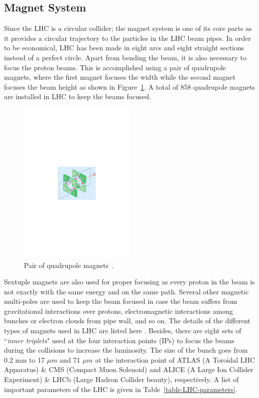 \subsection{Magnet System}
Since the LHC is a circular collider; the magnet system is one of its core parts as it provides a circular trajectory to the particles in the LHC beam pipes.
In order to be economical, LHC has been made in eight arcs and eight straight sections instead of a perfect circle. Apart from bending the beam, it is also necessary to focus the proton beams. 
This is accomplished using a pair of quadrupole magnets, where the first magnet focuses the width while the second magnet focuses the beam height as shown in Figure~\ref{fig:QuadrupoleMagnet}.
A total of 858 quadrupole magnets are installed in LHC to keep the beams focused. 
\begin{figure}[!htbp]
	\centering
	\includegraphics[width=0.50\textwidth]{figures/LHC/quadrupole_magnet_pair.pdf}
	\caption{Pair of quadrupole magnets~\cite{Vidal}.}
	\label{fig:QuadrupoleMagnet}
\end{figure}

Sextuple magnets are also used for proper focusing as every proton in the beam is not exactly with the same energy and on the same path. 
Several other magnetic multi-poles are used to keep the beam focused  in case the beam suffers from gravitational interactions over protons, electromagnetic interactions among bunches or electron clouds from pipe wall, and so on.
The details of the different types of magnets used in LHC are listed here \cite{WebLink:LHC_magnets}.
Besides, there are eight sets of ``\textit{inner triplets}" used at the four interaction points (IPs) to focus the beams during the collisions to increase the luminosity. The size of the bunch goes from 0.2 mm to 17 $\mu m$ and 71 $\mu m$ at the interaction point of ATLAS (A Toroidal LHC Apparatus) \& CMS (Compact Muon Solenoid) and ALICE (A Large Ion Collider Experiment) \& LHCb (Large Hadron Collider beauty), respectively. A list of important parameters of the LHC is given in Table~\ref{table:LHC-parameters}.

